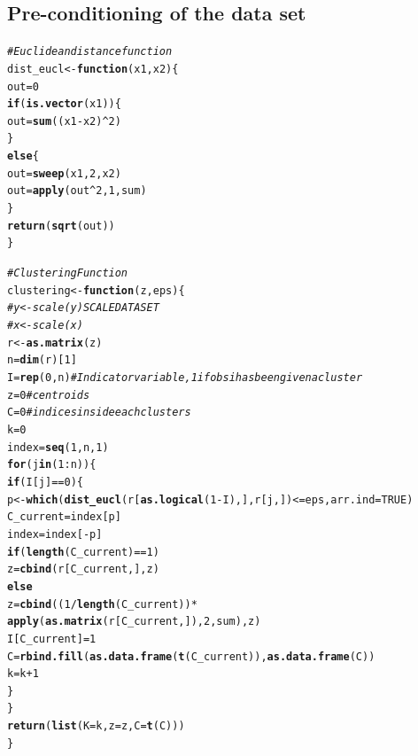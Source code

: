 \documentclass[11pt,a4paper]{report}\usepackage[]{graphicx}\usepackage[]{color}
\makeatletter
\newcommand{\hlnum}[1]{\textcolor[rgb]{0.686,0.059,0.569}{#1}}%
\newcommand{\hlcom}[1]{\textcolor[rgb]{0.678,0.584,0.686}{\textit{#1}}}%
\newcommand{\hlopt}[1]{\textcolor[rgb]{0,0,0}{#1}}%
\newcommand{\hlstd}[1]{\textcolor[rgb]{0.345,0.345,0.345}{#1}}%
\newcommand{\hlkwa}[1]{\textcolor[rgb]{0.161,0.373,0.58}{\textbf{#1}}}%
\newcommand{\hlkwb}[1]{\textcolor[rgb]{0.69,0.353,0.396}{#1}}%
\newcommand{\hlkwc}[1]{\textcolor[rgb]{0.333,0.667,0.333}{#1}}%
\newcommand{\hlkwd}[1]{\textcolor[rgb]{0.737,0.353,0.396}{\textbf{#1}}}%
\newenvironment{kframe}{%
 \def\at@end@of@kframe{}%
 \ifinner\ifhmode%
  \def\at@end@of@kframe{\end{minipage}}%
  \begin{minipage}{\columnwidth}%
 \fi\fi%
 \def\FrameCommand##1{\hskip\@totalleftmargin \hskip-\fboxsep
 \colorbox{shadecolor}{##1}\hskip-\fboxsep
     \hskip-\linewidth \hskip-\@totalleftmargin \hskip\columnwidth}%
 \MakeFramed {\advance\hsize-\width
   \@totalleftmargin\z@ \linewidth\hsize
   \@setminipage}}%
 {\par\unskip\endMakeFramed%
 \at@end@of@kframe}
\newenvironment{knitrout}{}{} %
\makeatother
\begin{document}
\begin{appendix}
\subsection{Pre-conditioning of the data set}
\begin{knitrout}
\color{fgcolor}\begin{kframe}
\begin{alltt}
\hlcom{#Euclidean distance function}
\hlstd{dist_eucl}\hlkwb{<-}\hlkwa{function}\hlstd{(}\hlkwc{x1}\hlstd{,}\hlkwc{x2}\hlstd{) \{}
  \hlstd{out}\hlkwb{=}\hlnum{0}
  \hlkwa{if} \hlstd{(}\hlkwd{is.vector}\hlstd{(x1)) \{}
    \hlstd{out}\hlkwb{=}\hlkwd{sum}\hlstd{((x1}\hlopt{-}\hlstd{x2)}\hlopt{^}\hlnum{2}\hlstd{)}
  \hlstd{\}}
  \hlkwa{else} \hlstd{\{}
    \hlstd{out}\hlkwb{=}\hlkwd{sweep}\hlstd{(x1,}\hlnum{2}\hlstd{,x2)}
    \hlstd{out}\hlkwb{=}\hlkwd{apply}\hlstd{(out}\hlopt{^}\hlnum{2}\hlstd{,}\hlnum{1}\hlstd{,sum)}
  \hlstd{\}}
  \hlkwd{return}\hlstd{(}\hlkwd{sqrt}\hlstd{(out))}
\hlstd{\}}

\hlcom{#Clustering Function}
\hlstd{clustering} \hlkwb{<-} \hlkwa{function}\hlstd{(}\hlkwc{z}\hlstd{,}\hlkwc{eps}\hlstd{) \{}
  \hlcom{# y<-scale(y) SCALE DATA SET}
  \hlcom{# x<-scale(x)}
  \hlstd{r}\hlkwb{<-}\hlkwd{as.matrix}\hlstd{(z)}
  \hlstd{n}\hlkwb{=}\hlkwd{dim}\hlstd{(r)[}\hlnum{1}\hlstd{]}
  \hlstd{I}\hlkwb{=}\hlkwd{rep}\hlstd{(}\hlnum{0}\hlstd{,n)} \hlcom{#Indicator variable, 1 if obs i has been given a cluster}
  \hlstd{z}\hlkwb{=}\hlnum{0} \hlcom{#centroids}
  \hlstd{C}\hlkwb{=}\hlnum{0} \hlcom{#indices inside each clusters}
  \hlstd{k}\hlkwb{=}\hlnum{0}
  \hlstd{index}\hlkwb{=}\hlkwd{seq}\hlstd{(}\hlnum{1}\hlstd{,n,}\hlnum{1}\hlstd{)}
  \hlkwa{for} \hlstd{(j} \hlkwa{in} \hlstd{(}\hlnum{1}\hlopt{:}\hlstd{n)) \{}
    \hlkwa{if}\hlstd{(I[j]}\hlopt{==}\hlnum{0}\hlstd{) \{}
      \hlstd{p}\hlkwb{<-}\hlkwd{which}\hlstd{(}\hlkwd{dist_eucl}\hlstd{(r[}\hlkwd{as.logical}\hlstd{(}\hlnum{1}\hlopt{-}\hlstd{I),],r[j,])}\hlopt{<=}\hlstd{eps,} \hlkwc{arr.ind} \hlstd{=} \hlnum{TRUE}\hlstd{)}
      \hlstd{C_current}\hlkwb{=}\hlstd{index[p]}
      \hlstd{index}\hlkwb{=}\hlstd{index[}\hlopt{-}\hlstd{p]}
      \hlkwa{if} \hlstd{(}\hlkwd{length}\hlstd{(C_current)}\hlopt{==}\hlnum{1}\hlstd{)}
        \hlstd{z}\hlkwb{=}\hlkwd{cbind}\hlstd{(r[C_current,],z)}
      \hlkwa{else}
        \hlstd{z}\hlkwb{=}\hlkwd{cbind}\hlstd{((}\hlnum{1}\hlopt{/}\hlkwd{length}\hlstd{(C_current))}\hlopt{*}
                  \hlkwd{apply}\hlstd{(}\hlkwd{as.matrix}\hlstd{(r[C_current,]),}\hlnum{2}\hlstd{,sum),z)}
      \hlstd{I[C_current]}\hlkwb{=}\hlnum{1}
      \hlstd{C}\hlkwb{=}\hlkwd{rbind.fill}\hlstd{(}\hlkwd{as.data.frame}\hlstd{(}\hlkwd{t}\hlstd{(C_current)),}\hlkwd{as.data.frame}\hlstd{(C))}
      \hlstd{k}\hlkwb{=}\hlstd{k}\hlopt{+}\hlnum{1}
    \hlstd{\}}
  \hlstd{\}}
  \hlkwd{return}\hlstd{(}\hlkwd{list}\hlstd{(}\hlkwc{K}\hlstd{=k,}\hlkwc{z}\hlstd{=z,}\hlkwc{C}\hlstd{=}\hlkwd{t}\hlstd{(C)))}
\hlstd{\}}


\end{alltt}
\end{kframe}
\end{knitrout}
\end{appendix}
\end{document}
